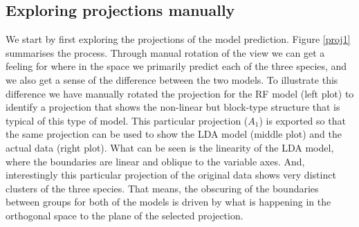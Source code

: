 \documentclass[]{interact}
\theoremstyle{plain}%
\theoremstyle{definition}
\theoremstyle{remark}
\begin{document}
\hypertarget{exploring-projections-manually}{%
\subsection{Exploring projections
manually}\label{exploring-projections-manually}}

We start by first exploring the projections of the model prediction.
Figure \ref{proj1} summarises the process. Through manual rotation of
the view we can get a feeling for where in the space we primarily
predict each of the three species, and we also get a sense of the
difference between the two models. To illustrate this difference we have
manually rotated the projection for the RF model (left plot) to identify
a projection that shows the non-linear but block-type structure that is
typical of this type of model. This particular projection (\(A_1\)) is
exported so that the same projection can be used to show the LDA model
(middle plot) and the actual data (right plot). What can be seen is the
linearity of the LDA model, where the boundaries are linear and oblique
to the variable axes. And, interestingly this particular projection of
the original data shows very distinct clusters of the three species.
That means, the obscuring of the boundaries between groups for both of
the models is driven by what is happening in the orthogonal space to the
plane of the selected projection.
\end{document}
